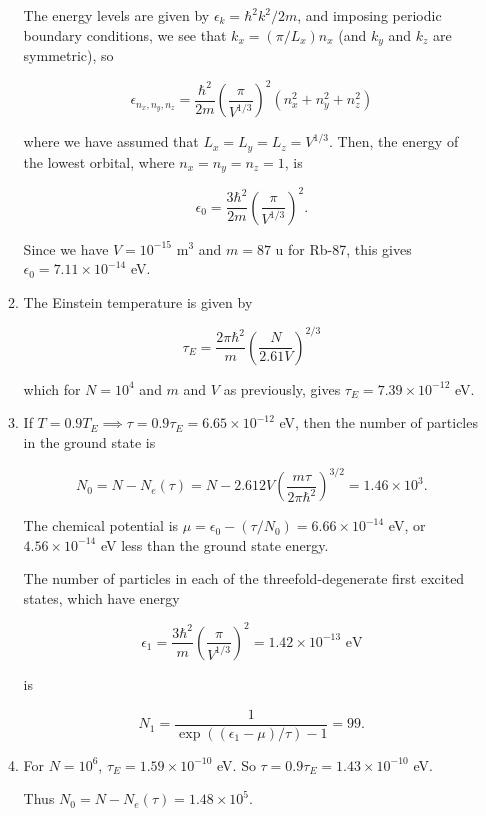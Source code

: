 \documentclass{article}
\begin{document}
\begin{enumerate}
\begin{enumerate}
		The energy levels are given by $\epsilon_k = \hbar^2 k^2 / 2m$, and imposing periodic boundary conditions, we see that $k_x =(\pi / L_x) n_x$ (and $k_y$ and $k_z$ are symmetric), so

		$$\epsilon_{n_x, n_y, n_z} = \frac{\hbar^2}{2m} \left( \frac{\pi}{V^{1/3}} \right)^2 (n_x^2 + n_y^2 + n_z^2)$$

		where we have assumed that $L_x = L_y = L_z = V^{1/3}$. Then, the energy of the lowest orbital, where $n_x = n_y = n_z = 1$, is

		$$\epsilon_0 = \frac{3 \hbar^2}{2m} \left( \frac{\pi}{V^{1/3}} \right)^2.$$

		Since we have $V = 10^{-15}$ m$^{3}$ and $m = 87$ u for Rb-87, this gives $\epsilon_0 = 7.11 \times 10^{-14}$ eV.

		\item

		The Einstein temperature is given by

		$$\tau_E = \frac{2 \pi \hbar^2}{m} \left( \frac{N}{2.61V} \right)^{2/3}$$

		which for $N = 10^4$ and $m$ and $V$ as previously, gives $\tau_E = 7.39 \times 10^{-12}$ eV.

		\item

		If $T = 0.9 T_E \implies \tau = 0.9 \tau_E = 6.65 \times 10^{-12}$ eV, then the number of particles in the ground state is 

		$$N_0 = N - N_e(\tau) = N - 2.612 V \left( \frac{m \tau}{2 \pi \hbar^2} \right)^{3/2} = 1.46 \times 10^3.$$

		The chemical potential is $\mu = \epsilon_0 - (\tau / N_0) = 6.66 \times 10^{-14}$ eV, or $4.56 \times 10^{-14}$ eV less than the ground state energy.

		The number of particles in each of the threefold-degenerate first excited states, which have energy

		$$\epsilon_1 = \frac{3\hbar^2}{m} \left( \frac{\pi}{V^{1/3}} \right)^2 = 1.42 \times 10^{-13} \text{ eV}$$

		is

		$$N_1 = \frac{1}{\exp((\epsilon_1 - \mu)/ \tau) -1} = 99.$$

		\item

		For $N = 10^6$, $\tau_E = 1.59 \times 10^{-10}$ eV. So $\tau = 0.9 \tau_E = 1.43 \times 10^{-10}$ eV.

		Thus $N_0 = N - N_e(\tau) = 1.48 \times 10^5$.


\end{enumerate}
\end{enumerate}
\end{document}
